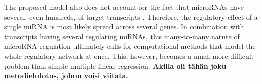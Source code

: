 The proposed model also does not account for the fact that microRNAs have
several, even hundreds, of target transcripts \citep{}. Therefore, the regulatory
effect of a single miRNA is most likely spread across several genes. In
combination with transcripts having several regulating miRNAs, this many-to-many
nature of microRNA regulation ultimately calls for computational methods
that model the whole regulatory network at once. This, however, becomes a much
more difficult problem than simple multiple linear regression. \textbf{Akilla
oli tähän joku metodiehdotus, johon voisi viitata.}
